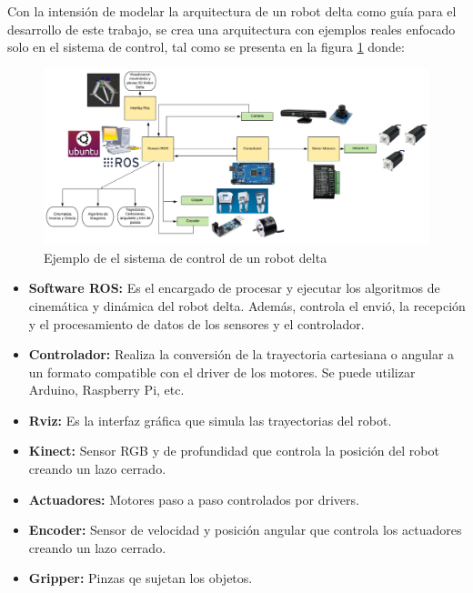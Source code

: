         \newpage

    Con la intensión de modelar la arquitectura de un robot delta como guía para el desarrollo de este trabajo, se crea una arquitectura con ejemplos reales enfocado solo en el sistema de control, tal como se presenta en la figura \ref{f:Cap3-2_esquema_sistema_control} donde:

    \begin{figure}[h]
        \centering
        \includegraphics[width=1\linewidth]{Main/Chapter3/Images3/3-2/sistema-de-control.png}
        \caption{Ejemplo de el sistema de control de un robot delta}
        \label{f:Cap3-2_esquema_sistema_control}
    \end{figure}
    
    \begin{itemize}
        \item \textbf{Software ROS:} Es el encargado de procesar y ejecutar los algoritmos de cinemática y dinámica del robot delta. Además, controla el envió, la recepción y el procesamiento de datos de los sensores y el controlador.
        \item \textbf{Controlador:} Realiza la conversión de la trayectoria cartesiana o angular a un formato compatible con el driver de los motores. Se puede utilizar Arduino, Raspberry Pi, etc.
        \item \textbf{Rviz:} Es la interfaz gráfica que simula las trayectorias del robot.
        \item \textbf{Kinect:} Sensor RGB y de profundidad que controla la posición del robot creando un lazo cerrado.
        \item \textbf{Actuadores:} Motores paso a paso controlados por drivers.
        \item \textbf{Encoder:} Sensor de velocidad y posición angular que controla los actuadores creando un lazo cerrado.
        \item \textbf{Gripper:} Pinzas qe sujetan los objetos.
    \end{itemize}
    
